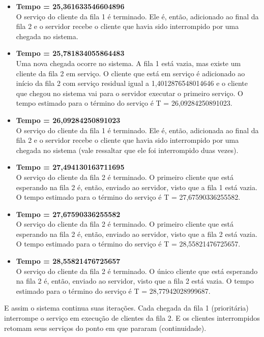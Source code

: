 \documentclass[a4paper,10pt]{article}
\begin{document}
\begin{itemize}
	  \item \textbf{Tempo = 25,361633546604896\\}
	  O serviço do cliente da fila 1 é terminado. Ele é, então, adicionado ao final da fila 2 e o servidor recebe o cliente que havia sido interrompido por uma chegada no sistema.
	  \item \textbf{Tempo = 25,781834055864483\\}
	  Uma nova chegada ocorre no sistema. A fila 1 está vazia, mas existe um cliente da fila 2 em serviço. O cliente que está em serviço é adicionado ao início da fila 2 com serviço residual igual a 1,4012876548014646 e o 
	  cliente que chegou no sistema vai para o servidor executar o primeiro serviço. O tempo estimado para o término do serviço é T = 26,09284250891023.
	  \item \textbf{Tempo = 26,09284250891023\\}
	  O serviço do cliente da fila 1 é terminado. Ele é, então, adicionada ao final da fila 2 e o servidor recebe o cliente que havia sido interrompido por uma chegada no sistema (vale ressaltar que ele foi interrompido duas vezes).
	  \item \textbf{Tempo = 27,494130163711695\\}
	  O serviço do cliente da fila 2 é terminado. O primeiro cliente que está esperando na fila 2 é, então, enviado ao servidor, visto que a fila 1 está vazia. O tempo estimado para o término do serviço é T = 27,67590336255582.
	  \item \textbf{Tempo = 27,67590336255582\\}
	  O serviço do cliente da fila 2 é terminado. O primeiro cliente que está esperando na fila 2 é, então, enviado ao servidor, visto que a fila 2 está vazia. O tempo estimado para o término do serviço é T = 28,55821476725657.
	  \item \textbf{Tempo = 28,55821476725657\\}
	  O serviço do cliente da fila 2 é terminado. O único cliente que está esperando na fila 2 é, então, enviado ao servidor, visto que a fila 2 está vazia. O tempo estimado para o término do serviço é T = 28,77942028999687.
      \end{itemize}
      E assim o sistema continua suas iterações. Cada chegada da fila 1 (prioritária) interrompe o serviço em execução de clientes da fila 2. E os clientes interrompidos retomam seus serviços do ponto em que pararam (continuidade).
\end{document}
